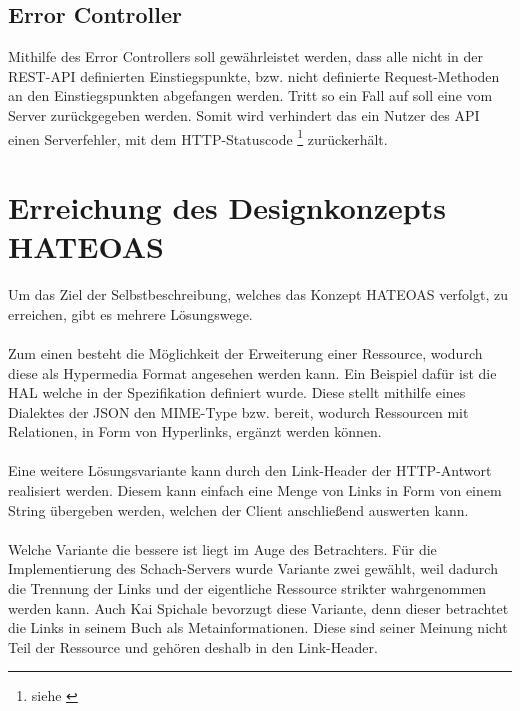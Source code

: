 \subsection{Error Controller}\label{sec:errorController}
Mithilfe des Error Controllers soll gewährleistet werden, dass alle nicht in der \gls{REST}-\gls{API} definierten Einstiegspunkte, bzw. nicht definierte Request-Methoden an den Einstiegspunkten abgefangen werden. Tritt so ein Fall auf soll eine  vom Server zurückgegeben werden. Somit wird verhindert das ein Nutzer des \gls{API} einen Serverfehler, mit dem HTTP-Statuscode \footnote{siehe \cite[A.2.5]{kretzschmar}} zurückerhält.

\section{Erreichung des Designkonzepts HATEOAS}\label{sec:konceptHATEOAS}
Um das Ziel der Selbstbeschreibung, welches das Konzept HATEOAS verfolgt, zu erreichen, gibt es mehrere Lösungswege.\\
\\
Zum einen besteht die Möglichkeit der Erweiterung einer Ressource, wodurch diese als Hypermedia Format angesehen werden kann. Ein Beispiel dafür ist die \gls{HAL} welche in der Spezifikation \cite{halSpezification} definiert wurde. Diese stellt mithilfe eines Dialektes der \gls{JSON} den \gls{MIME}-Type  bzw.  bereit, wodurch Ressourcen mit Relationen, in Form von Hyperlinks, ergänzt werden können.\\
\\
Eine weitere Lösungsvariante kann durch den Link-Header der \gls{HTTP}-Antwort realisiert werden. Diesem kann einfach eine Menge von Links in Form von einem String übergeben werden, welchen der Client anschließend auswerten kann.\\
\\
Welche Variante die bessere ist liegt im Auge des Betrachters. Für die Implementierung des Schach-Servers wurde Variante zwei gewählt, weil dadurch die Trennung der Links und der eigentliche Ressource strikter wahrgenommen werden kann. Auch Kai Spichale bevorzugt diese Variante, denn dieser betrachtet die Links in seinem Buch \cite{apiDesign} als Metainformationen. Diese sind seiner Meinung nicht Teil der Ressource und gehören deshalb in den Link-Header.